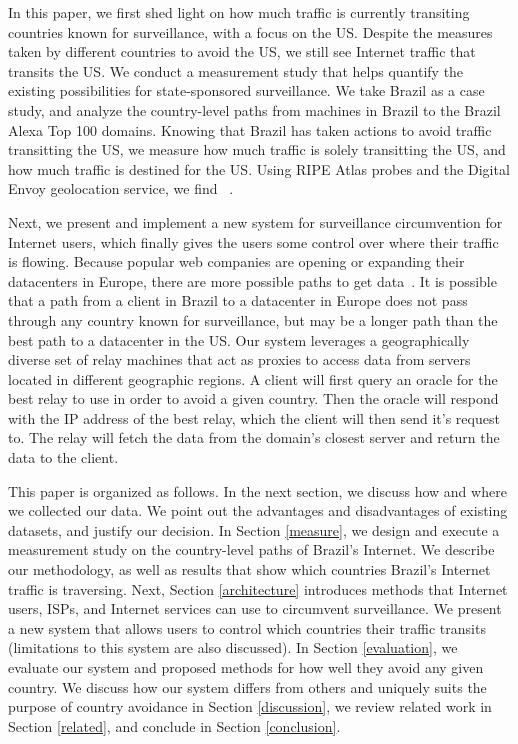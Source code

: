 In this paper, we first shed light on how much traffic is currently transiting countries known for surveillance, with a focus on the US.  Despite the measures taken by different countries to avoid the US, we still see Internet traffic that transits the US.  We conduct a measurement study that helps quantify the existing possibilities for state-sponsored surveillance.  We take Brazil as a case study, and analyze the country-level paths from machines in Brazil to the Brazil Alexa Top 100 domains.  Knowing that Brazil has taken actions to avoid traffic transitting the US, we measure how much traffic is solely transitting the US, and how much traffic is destined for the US.  Using RIPE Atlas probes and the Digital Envoy geolocation service, we find ~\cite{ripe_atlas, digital_envoy}.  

 Next, we present and implement a new system for surveillance circumvention for Internet users, which finally gives the users some control over where their traffic is flowing.  Because popular web companies are opening or expanding their datacenters in Europe, there are more possible paths to get data~\cite{eu_datacenters}.  It is possible that a path from a client in Brazil to a datacenter in Europe does not pass through any country known for surveillance, but may be a longer path than the best path to a datacenter in the US.  Our system leverages a geographically diverse set of relay machines that act as proxies to access data from servers located in different geographic regions.  A client will first query an oracle for the best relay to use in order to avoid a given country.  Then the oracle will respond with the IP address of the best relay, which the client will then send it's request to.  The relay will fetch the data from the domain's closest server and return the data to the client. 

This paper is organized as follows.   In the next section, we discuss how and where we collected our data.  We point out the advantages and disadvantages of existing datasets, and justify our decision.  In Section \ref{measure}, we design and execute a measurement study on the country-level paths of Brazil's Internet.  We describe our methodology, as well as results that show which countries Brazil's Internet traffic is traversing.  Next, Section \ref{architecture} introduces methods that Internet users, ISPs, and Internet services can use to circumvent surveillance.  We present a new system that allows users to control which countries their traffic transits (limitations to this system are also discussed).  In Section \ref{evaluation}, we evaluate our system and proposed methods for how well they avoid any given country.  We discuss how our system differs from others and uniquely suits the purpose of country avoidance in Section \ref{discussion}, we review related work in Section \ref{related}, and conclude in Section \ref{conclusion}.
